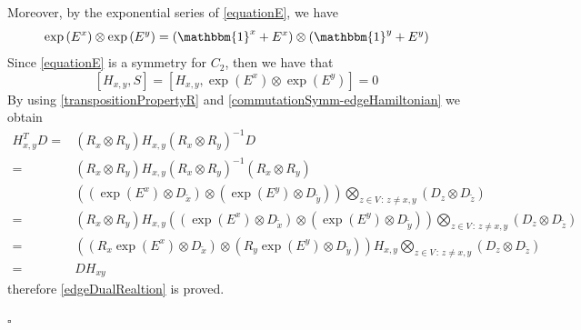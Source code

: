 \documentclass[11pt]{article}
\numberwithin{equation}{section}
\numberwithin{equation}{subsection}
\begin{document}
Moreover, by the exponential series of \eqref{equationE}, we have 
\begin{equation}
   \exp{(E^{x})}\otimes \exp{(E^{y})}= \left(\mathbbm{1}^{x}+E^{x}\right)\otimes \left(\mathbbm{1}^{y}+E^{y}\right)
\end{equation}
Since \eqref{equationE} is a symmetry for $C_{2}$, then we have that
\begin{equation}\label{commutationSymm-edgeHamiltonian}
\left[H_{x,y},S\right]=\left[H_{x,y},\exp{(E^{x})}\otimes \exp{(E^{y})}\right]=0
\end{equation}
By using \eqref{transpositionPropertyR} and \eqref{commutationSymm-edgeHamiltonian} we obtain
\begin{equation}
    \begin{split}
        H_{x,y}^{T}D=&\left(R_{x}\otimes R_{y}\right)H_{x,y}\left(R_{x}\otimes R_{y}\right)^{-1}D
        \\=&
        \left(R_{x}\otimes R_{y}\right)H_{x,y}\left(R_{x}\otimes R_{y}\right)^{-1}\left(R_{x}\otimes R_{y}\right)
        \\&
        \left(\left(\exp{(E^{x})}\otimes D_{\widetilde{x}}\right)\otimes \left(\exp{(E^{y})}\otimes D_{\widetilde{y}}\right)\right)\bigotimes_{z\in V\,:\,z\neq x,y}(D_{z}\otimes D_{\widetilde{z}})
        \\=&
        \left(R_{x}\otimes R_{y}\right)H_{x,y}\left(\left(\exp{(E^{x})}\otimes D_{\widetilde{x}}\right)\otimes \left(\exp{(E^{y})}\otimes D_{\widetilde{y}}\right)\right)\bigotimes_{z\in V\,:\,z\neq x,y}(D_{z}\otimes D_{\widetilde{z}})
    \\=&
    \left(\left(R_{x}\exp{(E^{x})}\otimes D_{\widetilde{x}}\right)\otimes \left(R_{y}\exp{(E^{y})}\otimes D_{\widetilde{y}}\right)\right)H_{x,y}\bigotimes_{z\in V\,:\, z\neq x,y}\left(D_{z}\otimes D_{\widetilde{z}}\right)
    \\=&
    D H_{xy}
    \end{split}
\end{equation}
 therefore \eqref{edgeDualRealtion} is proved. 
\begin{flushright}
$\square$
\end{flushright}
\end{document}
